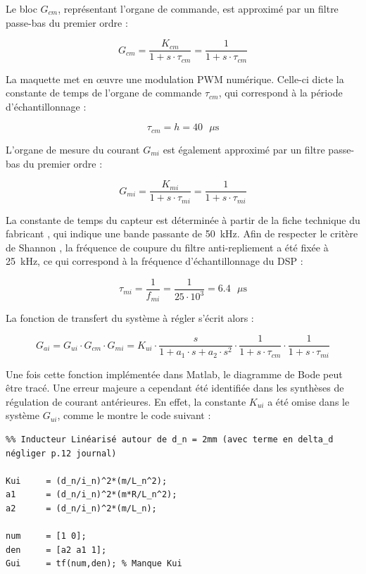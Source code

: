 Le bloc $G_{cm}$, représentant l'organe de commande, est approximé par un filtre passe-bas du premier ordre :

\begin{equation}
    G_{cm} = \frac{K_{cm}}{1+s \cdot\tau_{cm}} = \frac{1}{1+s \cdot\tau_{cm}}
\end{equation}

La maquette met en œuvre une modulation PWM numérique. Celle-ci dicte la constante de temps de l'organe de commande $\tau_{cm}$, qui correspond à la période d'échantillonnage :

\begin{equation}
    \tau_{cm} = h = 40 \text{ $\mu$s}
\end{equation}

L'organe de mesure du courant $G_{mi}$ est également approximé par un filtre passe-bas du premier ordre :

\begin{equation}
    G_{mi} = \frac{K_{mi}}{1+s \cdot\tau_{mi}} = \frac{1}{1+s \cdot\tau_{mi}}
\end{equation}

La constante de temps du capteur est déterminée à partir de la fiche technique du fabricant \cite{CaptCour}, qui indique une bande passante de 50~kHz. Afin de respecter le critère de Shannon \cite{Shanon}, la fréquence de coupure du filtre anti-repliement a été fixée à 25~kHz, ce qui correspond à la fréquence d'échantillonnage du DSP :

\begin{equation}
    \tau_{mi} = \frac{1}{f_{mi}} = \frac{1}{25\cdot 10^3} = 6.4 \text{ $\mu$s}
\end{equation}

La fonction de transfert du système à régler s'écrit alors :

\begin{equation}
    G_{ai} = G_{ui} \cdot G_{cm} \cdot G_{mi} = K_{ui}\cdot\frac{s}{1 + a_1 \cdot s + a_2\cdot s^2} \cdot \frac{1}{1+s \cdot\tau_{cm}} \cdot \frac{1}{1+s \cdot\tau_{mi}}
\end{equation}

Une fois cette fonction implémentée dans Matlab, le diagramme de Bode peut être tracé. Une erreur majeure a cependant été identifiée dans les synthèses de régulation de courant antérieures. En effet, la constante $K_{ui}$ a été omise dans le système $G_{ui}$, comme le montre le code suivant :

\begin{verbatim}
%% Inducteur Linéarisé autour de d_n = 2mm (avec terme en delta_d négliger p.12 journal)

Kui     = (d_n/i_n)^2*(m/L_n^2);
a1      = (d_n/i_n)^2*(m*R/L_n^2);
a2      = (d_n/i_n)^2*(m/L_n);

num     = [1 0];
den     = [a2 a1 1];
Gui     = tf(num,den); % Manque Kui
\end{verbatim}

